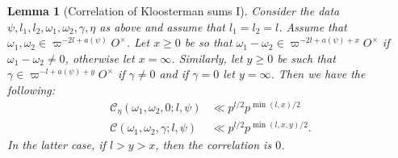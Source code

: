 \documentclass[a4paper,11pt]{amsart}
\newtheorem{lemma}[theorem]{Lemma}
\theoremstyle{definition}
\begin{document}
 \begin{lemma}[Correlation of Kloosterman sums I]\label{lem:correlationkloosterman}   Consider the data $\psi,l_1,l_2,\omega_1,\omega_2,\gamma,\eta$ as above and assume that $l_1=l_2=l$. Assume that $\omega_1,\omega_2\in \varpi^{-2l+a(\psi)}O^{\times}$. Let $x\geq 0$ be so that $\omega_1-\omega_2 \in \varpi^{-2l+a(\psi)+x}O^{\times}$ if $\omega_1-\omega_2 \neq0$, otherwise let $x=\infty$. Similarly, let $y\geq 0$ be such that $\gamma\in \varpi^{-l+a(\psi)+y}O^{\times}$ if $\gamma \neq 0$ and if $\gamma = 0$ let $y=\infty$.  Then we have the following:  \begin{align*}              \mathcal{C}_{\eta}(\omega_1,\omega_2,0;l,\psi) &\ll p^{l/2}p^{\min(l,x)/2}\\
   \mathcal{C}(\omega_1,\omega_2,\gamma;l,\psi) &\ll       p^{l/2}p^{\min(l,x,y)/2}.   
 \end{align*}
 In the latter case, if $l>y>x$, then the correlation is $0$.
 
 
 \end{lemma}
\end{document}
